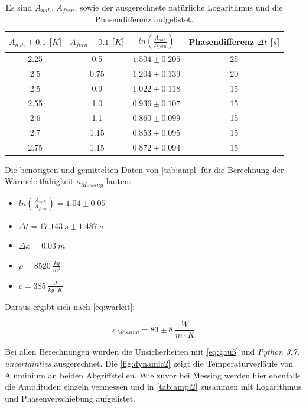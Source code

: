 \begin{table}[htbp]
    \centering
    \caption{Es sind $A_{nah}$, $A_{fern}$, sowie der ausgerechnete natürliche Logarithmus und die Phasendifferenz aufgelistet.}
    \label{tab:ampl}
    \begin{tabular}{c|c|c|c}
        \toprule
        $A_{nah}\pm 0.1$ [$K$] & $A_{fern}\pm 0.1$ [$K$] & $ln(\frac{A_{nah}}{A_{fern}})$ & Phasendifferenz $\Delta t$ [$s$]\\
        \midrule
        2.25 & 0.5 & $1.504\pm 0.205$ & 25\\
        2.5 & 0.75 & $1.204\pm 0.139$ & 20\\
        2.5 & 0.9 & $1.022\pm 0.118$ & 15\\
        2.55 & 1.0 & $0.936\pm 0.107$ & 15\\
        2.6 & 1.1 & $0.860\pm 0.099$ & 15\\
        2.7 & 1.15 & $0.853\pm 0.095$ & 15\\
        2.75 & 1.15 & $0.872\pm 0.094$ & 15\\
        \bottomrule
    \end{tabular}
\end{table}
\newpage
Die benötigten und gemittelten Daten von \autoref{tab:ampl} für die Berechnung der Wärmeleitfähigkeit $\kappa_{Messing}$ lauten:

\begin{itemize}
    \centering
    \item[] $ln(\frac{A_{nah}}{A_{fern}}) = 1.04\pm 0.05$ 
    \item[] $\Delta t = 17.143\ s\pm 1.487\ s$
    \item[] $\Delta x = 0.03\ m$
    \item[] $\rho = 8520\ \frac{kg}{m^3}$
    \item[] $c = 385\ \frac{J}{kg\cdot K}$
\end{itemize}

Daraus ergibt sich nach \autoref{eq:warleit}:
 
\begin{equation}
    \kappa_{Messing} = 83\pm 8\ \frac{W}{m\cdot K}
\end{equation}

Bei allen Berechnungen wurden die Unsicherheiten mit \autoref{eq:gauß} und \textit{Python 3.7, uncertainties} ausgerechnet.
\newpage
Die \autoref{fig:dynamic2} zeigt die Temperaturverläufe von Aluminium an beiden Abgriffstellen.
Wie zuvor bei Messing werden hier ebenfalls die Amplituden einzeln vermessen und in \autoref{tab:ampl2} zusammen mit Logarithmus und Phasenverschiebung aufgelistet.

